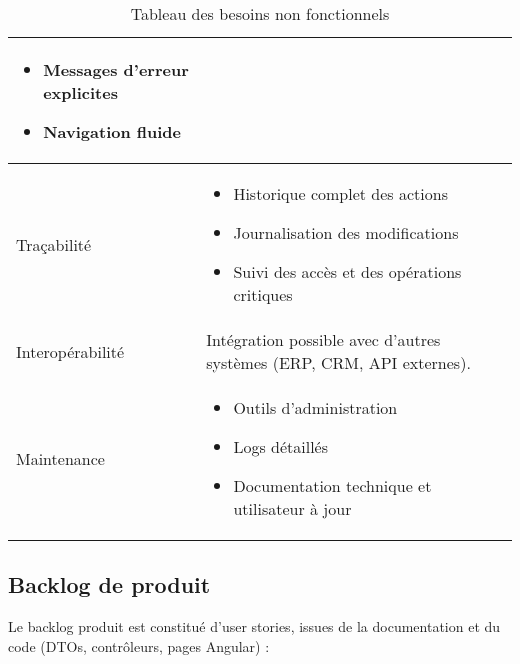 \begin{table}[htbp]
\begin{tabular}{|p{2.5cm}|p{12cm}|}
\begin{itemize}
            \item Messages d'erreur explicites
            \item Navigation fluide
        \end{itemize} \\
        \hline
        Traçabilité & 
        \begin{itemize}
            \item Historique complet des actions
            \item Journalisation des modifications
            \item Suivi des accès et des opérations critiques
        \end{itemize} \\
        \hline
        Interopérabilité & Intégration possible avec d'autres systèmes (ERP, CRM, API externes). \\
        \hline
        Maintenance & 
        \begin{itemize}
            \item Outils d'administration
            \item Logs détaillés
            \item Documentation technique et utilisateur à jour
        \end{itemize} \\
        \hline
    \end{tabular}
    \caption{Tableau des besoins non fonctionnels}
    \label{tab:besoins-non-fonctionnels}
\end{table}
\renewcommand{\arraystretch}{1}

\subsection{Backlog de produit}
\label{sec:backlog-de-produit}
Le backlog produit est constitué d'user stories, issues de la documentation et du code (DTOs, contrôleurs, pages Angular) :

